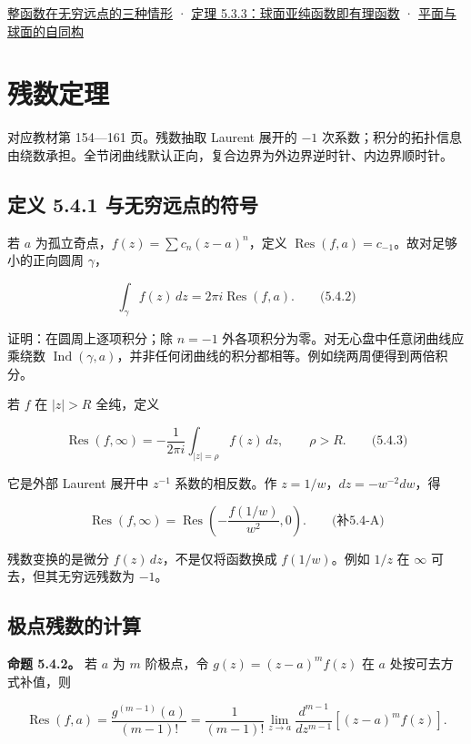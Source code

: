 \documentclass[11pt,a4paper]{article}
\begin{document}
\hyperref[ch05-s3-heading-1]{整函数在无穷远点的三种情形} ·
\hyperref[ch05-s3-heading-2]{定理 5.3.3：球面亚纯函数即有理函数} ·
\hyperref[ch05-s3-heading-3]{平面与球面的自同构}

\section{残数定理}
对应教材第 154---161 页。残数抽取 Laurent 展开的 \(-1\)
次系数；积分的拓扑信息由绕数承担。全节闭曲线默认正向，复合边界为外边界逆时针、内边界顺时针。

\subsection{定义 5.4.1 与无穷远点的符号}\label{ch05-s4-heading-1}

若 \(a\) 为孤立奇点，\(f(z)=\sum c_n(z-a)^n\)，定义
\(\operatorname{Res}(f,a)=c_{-1}\)。故对足够小的正向圆周 \(\gamma\)，

\[
\int_\gamma f(z)\,dz=2\pi i\operatorname{Res}(f,a).
\qquad\text{(5.4.2)}
\]

证明：在圆周上逐项积分；除 \(n=-1\)
外各项积分为零。对无心盘中任意闭曲线应乘绕数
\(\operatorname{Ind}(\gamma,a)\)，并非任何闭曲线的积分都相等。例如绕两周便得到两倍积分。

若 \(f\) 在 \(|z|>R\) 全纯，定义

\[
\operatorname{Res}(f,\infty)=-\frac1{2\pi i}\int_{|z|=\rho}f(z)\,dz,
\qquad \rho>R.
\qquad\text{(5.4.3)}
\]

它是外部 Laurent 展开中 \(z^{-1}\) 系数的相反数。作
\(z=1/w\)，\(dz=-w^{-2}dw\)，得

\[
\operatorname{Res}(f,\infty)
=\operatorname{Res}\left(-\frac{f(1/w)}{w^2},0\right).
\qquad\text{(补5.4-A)}
\]

残数变换的是微分 \(f(z)\,dz\)，不是仅将函数换成 \(f(1/w)\)。例如 \(1/z\)
在 \(\infty\) 可去，但其无穷远残数为 \(-1\)。

\subsection{极点残数的计算}\label{ch05-s4-heading-2}

\textbf{命题 5.4.2。} 若 \(a\) 为 \(m\) 阶极点，令 \(g(z)=(z-a)^mf(z)\)
在 \(a\) 处按可去方式补值，则

\[
\operatorname{Res}(f,a)=\frac{g^{(m-1)}(a)}{(m-1)!}
=\frac1{(m-1)!}\lim_{z\to a}\frac{d^{m-1}}{dz^{m-1}}[(z-a)^mf(z)].
\]
\end{document}
